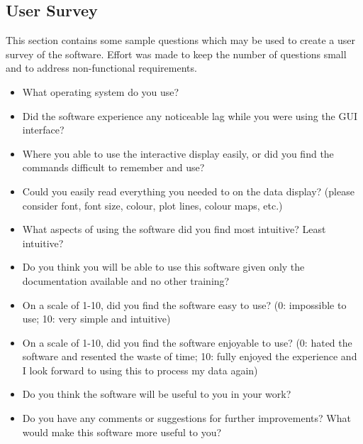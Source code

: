 \documentclass[12pt, titlepage]{article}
\begin{document}
\subsection{User Survey}
This section contains some sample questions which may be used to create a user
survey of the software. Effort was made to keep the number of questions small
and to address non-functional requirements.
\begin{itemize}
\item What operating system do you use?
\item Did the software experience any noticeable lag while you were using the
GUI interface?
\item Where you able to use the interactive display easily, or did you find the
commands difficult to remember and use?
\item Could you easily read everything you needed to on the data display?
(please consider font, font size, colour, plot lines, colour maps, etc.)
\item What aspects of using the software did you find most intuitive? Least
intuitive?
\item Do you think you will be able to use this software given only the
documentation available and no other training?
\item On a scale of 1-10, did you find the software easy to use? (0: impossible
to use; 10: very simple and intuitive)
\item On a scale of 1-10, did you find the software enjoyable to use? (0: hated
the software and resented the waste of time; 10: fully enjoyed the experience
and I look forward to using this to process my data again)
\item Do you think the software will be useful to you in your work?
\item Do you have any comments or suggestions for further improvements? What
would make this software more useful to you?
\end{itemize}

\end{document}
